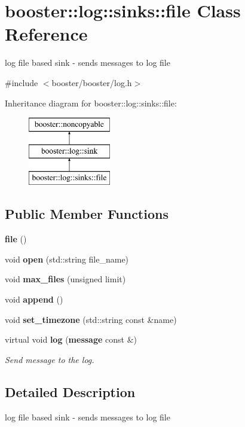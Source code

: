 \section{booster\-:\-:log\-:\-:sinks\-:\-:file \-Class \-Reference}
\label{classbooster_1_1log_1_1sinks_1_1file}


log file based sink -\/ sends messages to log file  




{\ttfamily \#include $<$booster/booster/log.\-h$>$}

\-Inheritance diagram for booster\-:\-:log\-:\-:sinks\-:\-:file\-:\begin{figure}[H]
\begin{center}
\leavevmode
\includegraphics[height=3.000000cm]{classbooster_1_1log_1_1sinks_1_1file}
\end{center}
\end{figure}
\subsection*{\-Public \-Member \-Functions}
\begin{DoxyCompactItemize}
\item 
{\bf file} ()
\item 
void {\bf open} (std\-::string file\-\_\-name)
\item 
void {\bf max\-\_\-files} (unsigned limit)
\item 
void {\bf append} ()
\item 
void {\bf set\-\_\-timezone} (std\-::string const \&name)
\item 
virtual void {\bf log} ({\bf message} const \&)\label{classbooster_1_1log_1_1sinks_1_1file_ad2a5335abaff993da082fb124056748a}

\begin{DoxyCompactList}\small\item\em \-Send message to the log. \end{DoxyCompactList}\end{DoxyCompactItemize}


\subsection{\-Detailed \-Description}
log file based sink -\/ sends messages to log file 


